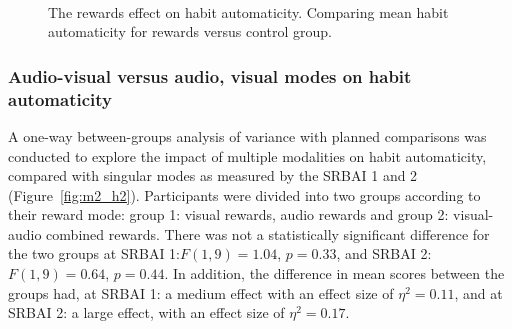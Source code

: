 \documentclass{scaffold/sigchi}
\begin{document}

\begin{figure}
  \centering
  \caption{The rewards effect on habit automaticity. Comparing mean habit automaticity for rewards versus control group.}~\label{fig:m2_h1}
\end{figure}


\subsubsection{Audio-visual versus audio, visual modes on habit automaticity}
A one-way between-groups analysis of variance with planned comparisons was conducted to explore the
impact of multiple modalities on habit automaticity, compared with singular modes as measured by the SRBAI 1 and 2 (Figure~\ref{fig:m2_h2}). Participants were divided into two groups according to their reward mode: group 1: visual rewards, audio rewards and group 2: visual-audio combined rewards. There was not a
statistically significant difference for the two groups at SRBAI 1:$ F(1,9) = 1.04$, $p = 0.33$, and SRBAI 2: $F(1,9) = 0.64$, $p = 0.44$. In addition, the difference in mean scores between the groups had, at SRBAI 1: a medium effect with an effect size of $\eta^{2} = 0.11$, and at SRBAI 2: a large effect, with an effect size of $\eta^{2} = 0.17$.
\end{document}
